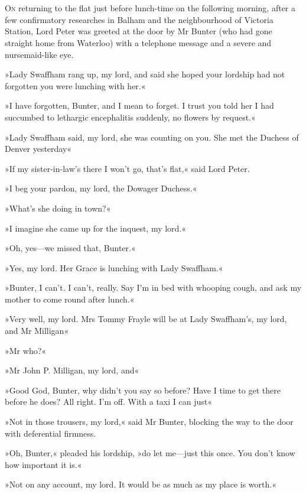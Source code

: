 \chapter[Chapter \thechapter]{}
\lettrine[lines=4]{O}{n} returning to the flat just before lunch-time on the following morning, after a few confirmatory researches in Balham and the neighbourhood of Victoria Station, Lord Peter was greeted at the door by Mr Bunter (who had gone straight home from Waterloo) with a telephone message and a severe and nursemaid-like eye.

»Lady Swaffham rang up, my lord, and said she hoped your lordship had not forgotten you were lunching with her.«

»I have forgotten, Bunter, and I mean to forget. I trust you told her I had succumbed to lethargic encephalitis suddenly, no flowers by request.«

»Lady Swaffham said, my lord, she was counting on you. She met the Duchess of Denver yesterday\longdash«

»If my sister-in-law's there I won't go, that's flat,« said Lord Peter.

»I beg your pardon, my lord, the Dowager Duchess.«

»What's she doing in town?«

»I imagine she came up for the inquest, my lord.«

»Oh, yes\allowbreak---\allowbreak we missed that, Bunter.«

»Yes, my lord. Her Grace is lunching with Lady Swaffham.«

»Bunter, I can't. I can't, really. Say I'm in bed with whooping cough, and ask my mother to come round after lunch.«

»Very well, my lord. Mrs Tommy Frayle will be at Lady Swaffham's, my lord, and Mr Milligan\longdash«

»Mr who?«

»Mr John P. Milligan, my lord, and\longdash«

»Good God, Bunter, why didn't you say so before? Have I time to get there before he does? All right. I'm off. With a taxi I can just\longdash«

»Not in those trousers, my lord,« said Mr Bunter, blocking the way to the door with deferential firmness.

»Oh, Bunter,« pleaded his lordship, »do let me\allowbreak---\allowbreak just this once. You don't know how important it is.«

»Not on any account, my lord. It would be as much as my place is worth.«

